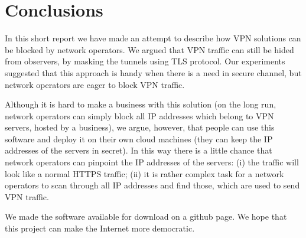 \section{Conclusions}
\label{section:conclusion}

In this short report we have made an attempt to describe how VPN solutions
can be blocked by network operators. We argued that VPN traffic can still be
hided from observers, by masking the tunnels using TLS protocol. 
Our experiments suggested that this approach is handy when there is a need
in secure channel, but network operators are eager to block VPN traffic.

Although it is hard to make a business with this solution (on the long
run, network operators can simply block all IP addresses which belong to VPN servers,
hosted by a business), we argue, however, that people can use this software
and deploy it on their own cloud machines (they can keep the IP addresses 
of the servers in secret). In this way there is a little chance
that network operators can pinpoint the IP addresses of the servers: (i)
the traffic will look like a normal HTTPS traffic; (ii) it is rather complex task
for a network operators to scan through all IP addresses and find those, which 
are used to send VPN traffic.

We made the software available for download on a github page. We hope that 
this project can make the Internet more democratic.